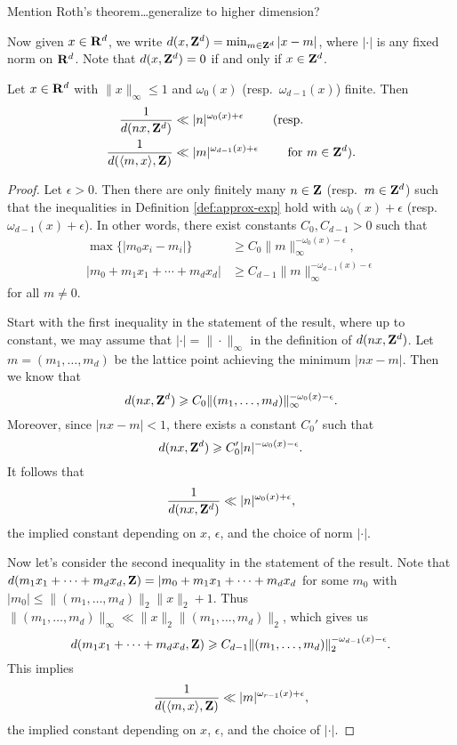 Mention Roth's theorem\ldots generalize to higher dimension?

Now given $x\in \mathbf{R}^d$, we write $d(x,\mathbf{Z}^d)=\min_{m\in \mathbf{Z}^d} |x-m|$, where 
$|\cdot|$ is any fixed norm on $\mathbf{R}^d$. Note that $d(x,\mathbf{Z}^d)=0$ if and only if 
$x\in \mathbf{Z}^d$. 

\begin{lemma}
Let $x\in \mathbf{R}^d$ with $\|x\|_\infty\leqslant 1$ and $\omega_0(x)$ 
(resp.~$\omega_{d-1}(x)$) finite. Then 
\begin{align*}
	\frac{1}{d(n x,\mathbf{Z}^d)} 
		&\ll |n|^{\omega_0(x)+\epsilon}\qquad \text{ (resp.} \\
	\frac{1}{d(\langle m,x\rangle, \mathbf{Z})} 
		&\ll |m|^{\omega_{d-1}(x)+\epsilon} \qquad\text{ for $m\in \mathbf{Z}^d$).}
\end{align*}
\end{lemma}
\begin{proof}
Let $\epsilon>0$. Then there are only finitely many $n\in \mathbf{Z}$ 
(resp.~$m\in \mathbf{Z}^d$) such that the inequalities in Definition 
\ref{def:approx-exp} hold with $\omega_0(x)+\epsilon$ 
(resp.~$\omega_{d-1}(x)+\epsilon$). In other words, there exist constants 
$C_0, C_{d-1}>0$ such that 
\begin{align*}
	\max\{|m_0 x_i - m_i|\} 
		&\geqslant C_0 \|m\|_\infty^{-\omega_0(x)-\epsilon} ,\\
	|m_0 + m_1 x_1 + \cdots + m_d x_d| 
		&\geqslant C_{d-1} \|m\|_\infty^{-\omega_{d-1}(x)-\epsilon} 
\end{align*}
for all $m\ne 0$. 

Start with the first inequality in the statement of the result, where up to 
constant, we may assume that $|\cdot| = \|\cdot\|_\infty$ in the definition of 
$d(n x,\mathbf{Z}^d)$. Let $m=(m_1,\dots,m_d)$ be the lattice point achieving the 
minimum $|n x - m|$. Then we know that 
\[
	d(n x,\mathbf{Z}^d) \geqslant C_0 \|(m_1,\dots,m_d)\|_\infty^{-\omega_0(x)-\epsilon} .
\]
Moreover, since $|n x-m|<1$, there exists a constant $C_0'$ such that 
\[
	d(n x,\mathbf{Z}^d) \geqslant C_0' |n|^{-\omega_0(x)-\epsilon} .
\]
It follows that 
\[
	\frac{1}{d(n x,\mathbf{Z}^d)} \ll |n|^{\omega_0(x)+\epsilon} ,
\]
the implied constant depending on $x$, $\epsilon$, and the choice of norm 
$|\cdot|$. 

Now let's consider the second inequality in the statement of the result. Note 
that $d(m_1 x_1 + \dots + m_d x_d,\mathbf{Z}) = |m_0 + m_1x_1 + \cdots + m_d x_d$ for 
some $m_0$ with $|m_0| \leqslant \|(m_1,\dots,m_d)\|_2 \|x\|_2 + 1$. Thus 
$\|(m_1,\dots,m_d)\|_\infty \ll \|x\|_2 \|(m_1,\dots,m_d)\|_2$, which gives us 
\[
	d(m_1 x_1 + \cdots + m_d x_d,\mathbf{Z}) \geqslant C_{d-1} \|(m_1,\dots,m_d)\|_2^{-\omega_{d-1}(x)-\epsilon} .
\]
This implies 
\[
	\frac{1}{d(\langle m,x\rangle,\mathbf{Z})} \ll |m|^{\omega_{r-1}(x)+\epsilon} ,
\]
the implied constant depending on $x$, $\epsilon$, and the choice of $|\cdot|$. 
\end{proof}






